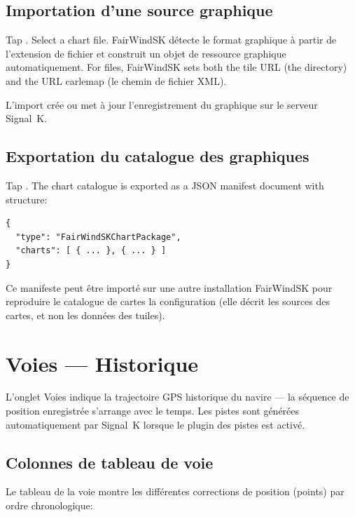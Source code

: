 \section{Importation d'une source graphique}

Tap . Select a chart file.
FairWindSK détecte le format graphique à partir de l'extension de fichier et construit un objet de ressource graphique
automatiquement.
For  files, FairWindSK sets both the tile URL (the directory) and the
URL carlemap (le chemin de fichier XML).

L'import crée ou met à jour l'enregistrement du graphique sur le serveur Signal~K.

\section{Exportation du catalogue des graphiques}

Tap . The chart catalogue is exported as a JSON manifest document with structure:

\begin{lstlisting}
{
  "type": "FairWindSKChartPackage",
  "charts": [ { ... }, { ... } ]
}
\end{lstlisting}

Ce manifeste peut être importé sur une autre installation FairWindSK pour reproduire le catalogue de cartes
la configuration (elle décrit les sources des cartes, et non les données des tuiles).

\chapter{Voies --- Historique}
\label{ch:tracks}

L'onglet Voies indique la trajectoire GPS historique du navire --- la séquence de position enregistrée
s'arrange avec le temps.
Les pistes sont générées automatiquement par Signal~K lorsque le plugin des pistes est activé.


\section{Colonnes de tableau de voie}

Le tableau de la voie montre les différentes corrections de position (points) par ordre chronologique:

